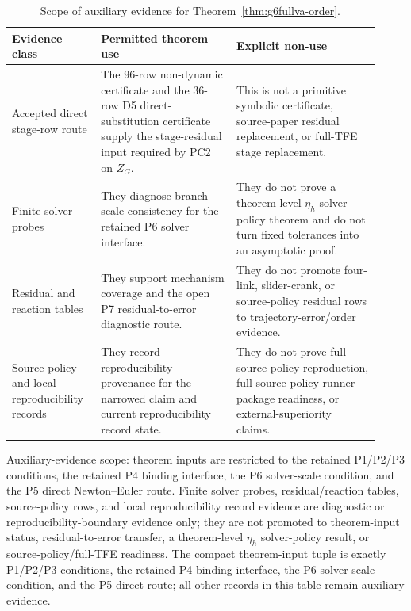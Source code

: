 \documentclass[preprint,12pt]{elsarticle}
\newcommand{\tfe}{TFE}
\begin{document}
\begin{table}[htbp]
\centering
\caption{Scope of auxiliary evidence for Theorem~\ref{thm:g6fullva-order}.}
\label{tab:theorem-use-rule}
\scriptsize
\setlength{\tabcolsep}{2pt}
\renewcommand{\arraystretch}{0.9}
\begin{tabular}{P{0.22\linewidth}P{0.34\linewidth}P{0.36\linewidth}}
\toprule
Evidence class & Permitted theorem use & Explicit non-use \\
\midrule
Accepted direct stage-row route &
The 96-row non-dynamic certificate and the 36-row D5 direct-substitution
certificate supply the stage-residual input required by PC2 on \(Z_G\). &
This is not a primitive symbolic certificate, source-paper residual
replacement, or full-\tfe{} stage replacement. \\
Finite solver probes &
They diagnose branch-scale consistency for the retained P6 solver interface. &
They do not prove a theorem-level \(\eta_h\) solver-policy theorem and do not
turn fixed tolerances into an asymptotic proof. \\
Residual and reaction tables &
They support mechanism coverage and the open P7 residual-to-error diagnostic
route. &
They do not promote four-link, slider-crank, or source-policy residual rows to
trajectory-error/order evidence. \\
Source-policy and local reproducibility records &
They record reproducibility provenance for the narrowed claim and current
reproducibility record state. &
They do not prove full source-policy reproduction, full source-policy runner
package readiness, or external-superiority claims. \\
\bottomrule
\end{tabular}
\end{table}

Auxiliary-evidence scope: theorem inputs are restricted to the retained
P1/P2/P3 conditions, the retained P4 binding interface, the P6 solver-scale
condition, and the P5 direct Newton--Euler route. Finite solver
probes, residual/reaction tables, source-policy rows, and local reproducibility record
evidence are diagnostic or reproducibility-boundary evidence only; they are not promoted
to theorem-input status, residual-to-error transfer, a theorem-level
\(\eta_h\) solver-policy result, or source-policy/full-TFE readiness.
The compact theorem-input tuple is exactly P1/P2/P3 conditions, the retained
P4 binding interface, the P6 solver-scale condition, and the P5 direct route;
all other records in this table remain auxiliary evidence.
\end{document}
